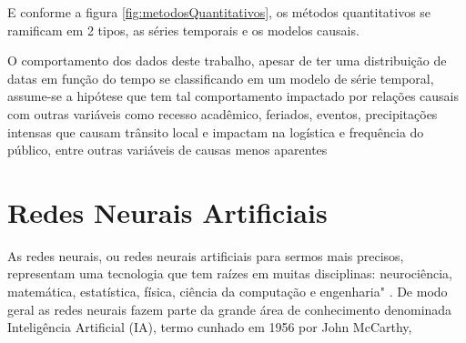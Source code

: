 E conforme a figura \ref{fig:metodosQuantitativos}, os métodos quantitativos se ramificam em 2 tipos, as séries temporais e os modelos causais.

          \begin{figure}[H]
          \end{figure}

O comportamento dos dados deste trabalho, apesar de ter uma distribuição de datas em função do tempo se classificando em um modelo de série temporal, assume-se a hipótese que tem tal comportamento impactado por relações causais com outras variáveis como recesso acadêmico, feriados, eventos, precipitações intensas que causam trânsito local e impactam na logística e frequência do público, entre outras variáveis de causas menos aparentes

\section{Redes Neurais Artificiais}

As redes neurais, ou redes neurais artificiais  para sermos mais precisos, representam uma tecnologia que tem raízes em muitas disciplinas: neurociência, matemática, estatística, física, ciência da computação e engenharia" \cite{Haykin1994}. 
De modo geral as redes neurais fazem parte da grande área de conhecimento denominada Inteligência Artificial (IA), termo cunhado em 1956 por John McCarthy, 

